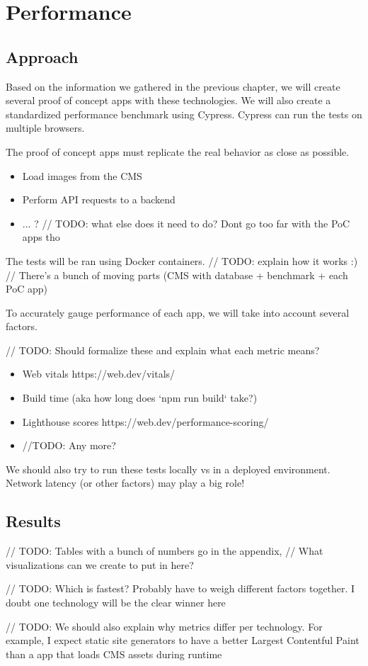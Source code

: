 \chapter{Performance} %

\label{Chapter3} 


\section{Approach}


Based on the information we gathered in the previous chapter, we will create several proof of concept apps with these technologies.
We will also create a standardized performance benchmark using Cypress. Cypress can run the tests on multiple browsers.


The proof of concept apps must replicate the real behavior as close as possible. 

\begin{itemize}
	\item Load images from the CMS
	\item Perform API requests to a backend
	\item ... ? // TODO: what else does it need to do? Dont go too far with the PoC apps tho
\end{itemize}


The tests will be ran using Docker containers.
// TODO: explain how it works :)
// There's a bunch of moving parts (CMS with database + benchmark + each PoC app)


To accurately gauge performance of each app, we will take into account several factors.

// TODO: Should formalize these and explain what each metric means?

\begin{itemize}
	\item Web vitals  https://web.dev/vitals/
	\item Build time (aka how long does `npm run build` take?)
	\item Lighthouse scores https://web.dev/performance-scoring/
	\item //TODO: Any more?
\end{itemize}

We should also try to run these tests locally vs in a deployed environment. Network latency (or other factors) may play a big role! 

\section{Results}

// TODO: Tables with a bunch of numbers go in the appendix,
// What visualizations can we create to put in here?

// TODO:
Which is fastest? Probably have to weigh different factors together. 
I doubt one technology will be the clear winner here

// TODO:
We should also explain why metrics differ per technology.
For example, I expect static site generators to have a better Largest Contentful Paint than a app that loads CMS assets during runtime